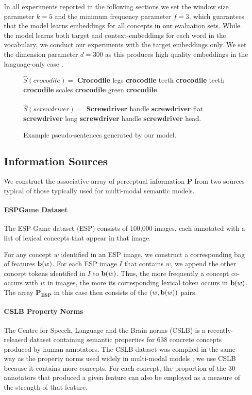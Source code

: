 In all experiments reported in the following sections we set the window size parameter \(k = 5\) and the minimum frequency parameter \(f = 3\), which guarantees that the model learns embeddings for all concepts in our evaluation sets. While the model learns both target and context-embeddings for each word in the vocabulary, we conduct our experiments with the target embeddings only. We set the dimension parameter \(d = 300 \) as this produces high quality embeddings in the language-only case \cite{mikolov2013efficient}. 

\begin{figure} \(\hat{S}(crocodile) =\)\small{ {\bf Crocodile} legs {\bf crocodile} teeth {\bf crocodile} teeth {\bf crocodile} scales {\bf crocodile} green {\bf crocodile}. \\ \\ \(\hat{S}(screwdriver)=\) { \bf Screwdriver} handle {\bf screwdriver} flat  {\bf screwdriver} long {\bf screwdriver}  handle {\bf screwdriver}  head. } \caption{\label{examples} Example pseudo-sentences generated by our model.}\end{figure}

\subsection{Information Sources}
\label{percep_sources}

We construct the associative array of perceptual information \(\mathbf{P}\) from two sources typical of those typically used for multi-modal semantic models.

\paragraph{ESPGame Dataset} The ESP-Game dataset (ESP) \cite{von2004labeling} consists of 100,000 images, each annotated with a list of lexical concepts that appear in that image.  

For any concept \(w\) identified in an ESP image, we construct a corresponding bag of features \({\bf b}(w)\). For each ESP image \(I\) that contains \(w\), we append the other concept tokens identified in \(I\) to \({\bf b}(w)\). Thus, the more frequently a concept co-occurs with \(w\) in images, the more its corresponding lexical token occurs in \({\bf b}(w)\). The array \(\mathbf{P_{ESP}}\) in this case then consists of the  \( (w,  {\bf b}(w) ) \) pairs.

\paragraph{CSLB Property Norms} The Centre for Speech, Language and the Brain norms (CSLB) \cite{devereux2013centre} is a recently-released dataset containing semantic properties for 638 concrete concepts produced by human annotators. The CSLB dataset was compiled in the same way as the \cite{mcrae2005semantic} property norms used widely in multi-modal models \cite{silberer2012grounded,rollermultimodal}; we use CSLB because it contains more concepts. For each concept, the proportion of the 30 annotators that produced a given feature can also be employed as a measure of the strength of that feature.

